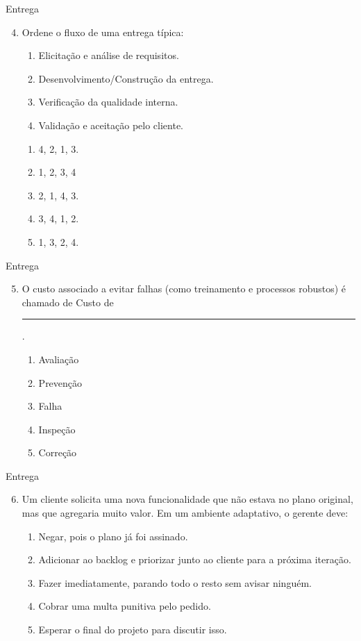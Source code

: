 \documentclass{beamer}
\begin{document}
\begin{frame}{Entrega}
	\begin{enumerate}
		\setcounter{enumi}{3}
		\justifying
		\item Ordene o fluxo de uma entrega típica:
		\begin{enumerate}[I]
			\item Elicitação e análise de requisitos.
			\item Desenvolvimento/Construção da entrega.
			\item Verificação da qualidade interna.
			\item Validação e aceitação pelo cliente.
		\end{enumerate}
		\begin{enumerate}[a]
			\item 4, 2, 1, 3.
			\item \alert<2>{1, 2, 3, 4}
			\item 2, 1, 4, 3.
			\item 3, 4, 1, 2.
			\item 1, 3, 2, 4.
		\end{enumerate}
	\end{enumerate}
\end{frame}

\begin{frame}{Entrega}
	\begin{enumerate}
		\setcounter{enumi}{4}
		\justifying
		\item O custo associado a evitar falhas (como treinamento e processos robustos) é chamado de Custo de \rule{60pt}{1pt}.
		\begin{enumerate}[a]
			\item Avaliação
			\item \alert<2>{Prevenção}
			\item Falha
			\item Inspeção
			\item Correção
		\end{enumerate}
	\end{enumerate}
\end{frame}

\begin{frame}{Entrega}
	\begin{enumerate}
		\setcounter{enumi}{5}
		\justifying
		\item Um cliente solicita uma nova funcionalidade que não estava no plano original, mas que agregaria muito valor. Em um ambiente adaptativo, o gerente deve:
		\begin{enumerate}[a]
			\item Negar, pois o plano já foi assinado.
			\item \alert<2>{Adicionar ao backlog e priorizar junto ao cliente para a próxima iteração.}
			\item Fazer imediatamente, parando todo o resto sem avisar ninguém.
			\item Cobrar uma multa punitiva pelo pedido.
			\item Esperar o final do projeto para discutir isso.
		\end{enumerate}
	\end{enumerate}
\end{frame}
\end{document}
